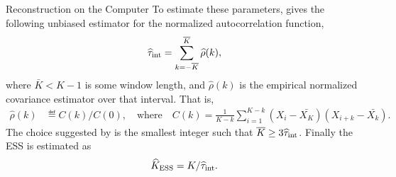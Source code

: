 \begin{chapter}{Reconstruction on the Computer}
To estimate these parameters, \citep{sokal1997monte} gives the following unbiased estimator for the normalized autocorrelation function,
\begin{equation}
  \hat\tau_{\rm int}=\sum_{k=-\bar K}^{\bar K} \hat{\rho}(k),
\end{equation}
where $\bar K< K-1$ is some window length, and $\hat \rho(k)$ is the empirical normalized covariance estimator over that interval.
That is,
\begin{align}
\hat\rho(k)&\eqdef C(k)/C(0), \quad\text{where}\quad
C(k)=\frac{1}{K-k}\sum_{i=1}^{K-k} (X_i-\bar{X_K})(X_{i+k}-\bar{X_k}).
\end{align}
The choice suggested by \cite{sokal1997monte} is the smallest integer such that $\bar K\geq 3 \hat\tau_{\rm int}$. 
Finally the ESS is estimated as
\begin{equation}
\label{ESS}
\hat{K}_{\rm ESS}=K/\hat\tau_{\rm int}.
\end{equation}


\end{chapter}
